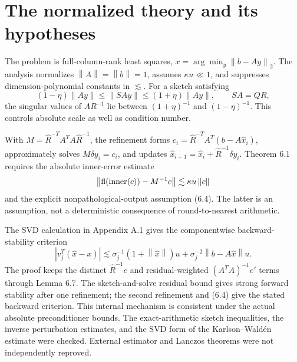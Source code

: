 \documentclass[10pt]{article}
\begin{document}
\section*{The normalized theory and its hypotheses}
The problem is full-column-rank least squares, \(x=\arg\min_y\left\lVert b-Ay\right\rVert_2\). The analysis normalizes \(\left\lVert A\right\rVert=\left\lVert b\right\rVert=1\), assumes \(\kappa u\ll1\), and suppresses dimension-polynomial constants in \(\lesssim\). For a sketch satisfying \[(1-\eta)\left\lVert Ay\right\rVert\le\left\lVert SAy\right\rVert\le(1+\eta)\left\lVert Ay\right\rVert,
 \qquad SA=QR,\] the singular values of \(AR^{-1}\) lie between \((1+\eta)^{-1}\) and \((1-\eta)^{-1}\). This controls absolute scale as well as condition number.\par
With \(M=\widehat R^{-T}A^TA\widehat R^{-1}\), the refinement forms \(c_i=\widehat R^{-T}A^T(b-A\widehat x_i)\), approximately solves \(M\delta y_i=c_i\), and updates \(\widehat x_{i+1}=\widehat x_i+\widehat R^{-1}\delta y_i\). Theorem 6.1 requires the absolute inner-error estimate \[\left\lVert\operatorname{fl}({\rm inner}(c))-M^{-1}c\right\rVert
       \lesssim\kappa u\left\lVert c\right\rVert\] and the explicit nonpathological-output assumption (6.4). The latter is an assumption, not a deterministic consequence of round-to-nearest arithmetic.\par
The SVD calculation in Appendix A.1 gives the componentwise backward-stability criterion \[|v_j^T(\widehat x-x)|
 \lesssim \sigma_j^{-1}(1+\left\lVert\widehat x\right\rVert)u
          +\sigma_j^{-2}\left\lVert b-A\widehat x\right\rVert u.\] The proof keeps the distinct \(\widehat R^{-1}e\) and residual-weighted \((A^TA)^{-1}e'\) terms through Lemma 6.7. The sketch-and-solve residual bound gives strong forward stability after one refinement; the second refinement and (6.4) give the stated backward criterion. This internal mechanism is consistent under the actual absolute preconditioner bounds. The exact-arithmetic sketch inequalities, the inverse perturbation estimates, and the SVD form of the Karlson–Waldén estimate were checked. External estimator and Lanczos theorems were not independently reproved.\par
\end{document}

